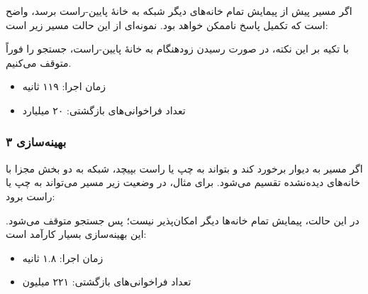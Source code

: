 اگر مسیر پیش از پیمایش تمام خانه‌های دیگر شبکه به خانهٔ پایین-راست برسد، واضح است که تکمیل پاسخ ناممکن خواهد بود. نمونه‌ای از این حالت مسیر زیر است:

\begin{center}
\end{center}
با تکیه بر این نکته، در صورت رسیدن زودهنگام به خانهٔ پایین-راست، جستجو را فوراً متوقف می‌کنیم.
\begin{itemize}
\item
زمان اجرا: ۱۱۹ ثانیه
\item
تعداد فراخوانی‌های بازگشتی: ۲۰ میلیارد
\end{itemize}

\subsubsection{بهینه‌سازی ۳}

اگر مسیر به دیوار برخورد کند و بتواند به چپ یا راست بپیچد، شبکه به دو بخش مجزا با خانه‌های دیده‌نشده تقسیم می‌شود. برای مثال، در وضعیت زیر مسیر می‌تواند به چپ یا راست برود:

\begin{center}
\end{center}
در این حالت، پیمایش تمام خانه‌ها دیگر امکان‌پذیر نیست؛ پس جستجو متوقف می‌شود. این بهینه‌سازی بسیار کارآمد است:

\begin{itemize}
\item
زمان اجرا: ۱.۸ ثانیه
\item
تعداد فراخوانی‌های بازگشتی: ۲۲۱ میلیون
\end{itemize}

